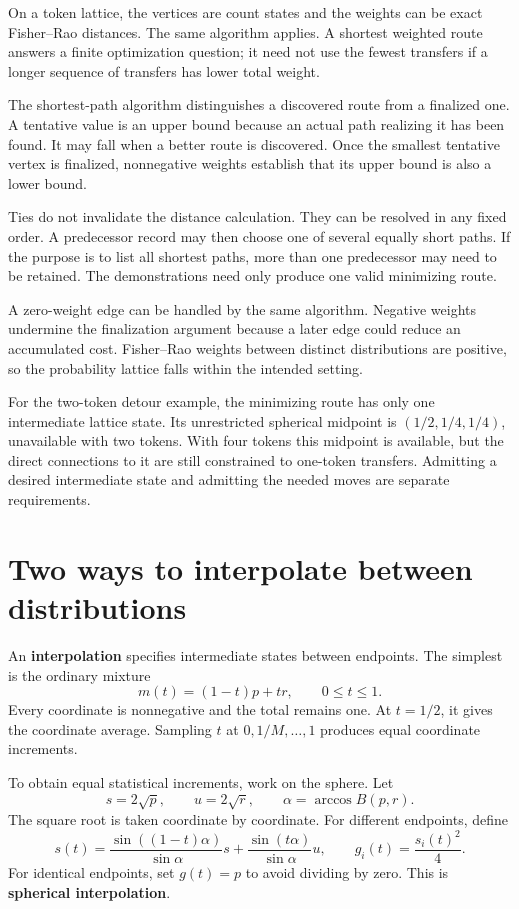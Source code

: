 \documentclass[11pt,oneside,openany]{book}
\theoremstyle{definition}
\theoremstyle{remark}
\numberwithin{equation}{chapter}
\begin{document}
On a token lattice, the vertices are count states and the weights can be exact Fisher--Rao distances. The same algorithm applies. A shortest weighted route answers a finite optimization question; it need not use the fewest transfers if a longer sequence of transfers has lower total weight.

The shortest-path algorithm distinguishes a discovered route from a finalized one. A tentative value is an upper bound because an actual path realizing it has been found. It may fall when a better route is discovered. Once the smallest tentative vertex is finalized, nonnegative weights establish that its upper bound is also a lower bound.

Ties do not invalidate the distance calculation. They can be resolved in any fixed order. A predecessor record may then choose one of several equally short paths. If the purpose is to list all shortest paths, more than one predecessor may need to be retained. The demonstrations need only produce one valid minimizing route.

A zero-weight edge can be handled by the same algorithm. Negative weights undermine the finalization argument because a later edge could reduce an accumulated cost. Fisher--Rao weights between distinct distributions are positive, so the probability lattice falls within the intended setting.

For the two-token detour example, the minimizing route has only one intermediate lattice state. Its unrestricted spherical midpoint is \((1/2,1/4,1/4)\), unavailable with two tokens. With four tokens this midpoint is available, but the direct connections to it are still constrained to one-token transfers. Admitting a desired intermediate state and admitting the needed moves are separate requirements.

\section{Two ways to interpolate between distributions}\label{ch08-two-ways-to-interpolate-between-distributions}

An \textbf{interpolation} specifies intermediate states between endpoints. The simplest is the ordinary mixture \[m(t)=(1-t)p+tr,\qquad 0\leq t\leq1.\] Every coordinate is nonnegative and the total remains one. At \(t=1/2\), it gives the coordinate average. Sampling \(t\) at \(0,1/M,\ldots,1\) produces equal coordinate increments.

To obtain equal statistical increments, work on the sphere. Let \[s=2\sqrt p,\qquad u=2\sqrt r,\qquad
\alpha=\arccos B(p,r).\] The square root is taken coordinate by coordinate. For different endpoints, define \[s(t)=\frac{\sin((1-t)\alpha)}{\sin\alpha}s
+\frac{\sin(t\alpha)}{\sin\alpha}u,\qquad
g_i(t)=\frac{s_i(t)^2}{4}.\] For identical endpoints, set \(g(t)=p\) to avoid dividing by zero. This is \textbf{spherical interpolation}.
\end{document}
